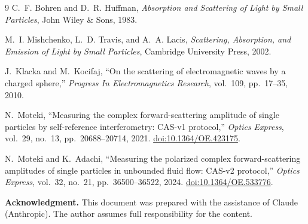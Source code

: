 \documentclass[a4paper,11pt]{article}
\begin{document}
\clearpage
\begin{thebibliography}{9}
  C.~F. Bohren and D.~R. Huffman,
  \textit{Absorption and Scattering of Light by Small Particles},
  John Wiley \& Sons, 1983.

  M.~I. Mishchenko, L.~D. Travis, and A.~A. Lacis,
  \textit{Scattering, Absorption, and Emission of Light by Small Particles},
  Cambridge University Press, 2002.

  J.~Klacka and M.~Kocifaj,
  ``On the scattering of electromagnetic waves by a charged sphere,''
  \textit{Progress In Electromagnetics Research}, vol.~109, pp.~17--35, 2010.

  N.~Moteki,
  ``Measuring the complex forward-scattering amplitude of single particles
  by self-reference interferometry: CAS-v1 protocol,''
  \textit{Optics Express}, vol.~29, no.~13, pp.~20688--20714, 2021.
  \href{https://doi.org/10.1364/OE.423175}{doi:10.1364/OE.423175}.

  N.~Moteki and K.~Adachi,
  ``Measuring the polarized complex forward-scattering amplitudes of single
  particles in unbounded fluid flow: CAS-v2 protocol,''
  \textit{Optics Express}, vol.~32, no.~21, pp.~36500--36522, 2024.
  \href{https://doi.org/10.1364/OE.533776}{doi:10.1364/OE.533776}.
\end{thebibliography}

\bigskip
\noindent\textbf{Acknowledgment.}\quad
This document was prepared with the assistance of Claude (Anthropic).
The author assumes full responsibility for the content.
\end{document}
